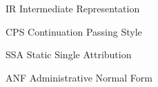 
\listoffigures*
\cleardoublepage%



\listoftables*
\cleardoublepage%

\begin{siglas}
    \item[IR] Intermediate Representation
    \item[CPS] Continuation Passing Style
    \item[SSA] Static Single Attribution
    \item[ANF] Administrative Normal Form
\end{siglas}




